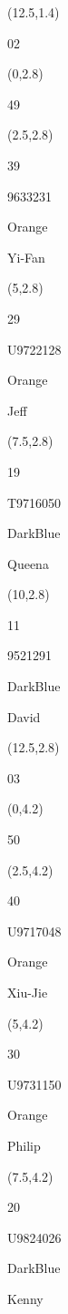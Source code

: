 \documentclass[a4paper]{article}
\newcommand{\myseat}[4]{%
\vspace{-0.1cm}
\parbox[t][2.2cm][t]{3.5cm}{
\small #1 %
\begin{description}
\vspace{-0.1cm}
\item [ID:] #2
\vspace{-0.1cm}
\item [Team:] #3 \normalsize
\vspace{-0.1cm}
\item \normalsize #4
\vspace{-0.1cm}
\end{description}
}
}
\begin{document}
\begin{CJK}{UTF8}{cyberbit}
\begin{textblock}{2.5}(12.5,1.4)
\textblockcolor{}
	\myseat{02}{}{}{}
\end{textblock}

\begin{textblock}{2.5}(0,2.8)
\textblockcolor{}
	\myseat{49}{}{}{}
\end{textblock}

\begin{textblock}{2.5}(2.5,2.8)
	\myseat{39}{9633231}{Orange}{Yi-Fan}
\end{textblock}

\begin{textblock}{2.5}(5,2.8)
	\myseat{29}{U9722128}{Orange}{Jeff}
\end{textblock}

\begin{textblock}{2.5}(7.5,2.8)
	\myseat{19}{T9716050}{DarkBlue}{Queena}
\end{textblock}

\begin{textblock}{2.5}(10,2.8)
	\myseat{11}{9521291}{DarkBlue}{David}
\end{textblock}

\begin{textblock}{2.5}(12.5,2.8)
\textblockcolor{}
	\myseat{03}{}{}{}
\end{textblock}

\begin{textblock}{2.5}(0,4.2)
\textblockcolor{}
	\myseat{50}{}{}{}
\end{textblock}

\begin{textblock}{2.5}(2.5,4.2)
	\myseat{40}{U9717048}{Orange}{Xiu-Jie}
\end{textblock}

\begin{textblock}{2.5}(5,4.2)
	\myseat{30}{U9731150}{Orange}{Philip}
\end{textblock}

\begin{textblock}{2.5}(7.5,4.2)
	\myseat{20}{U9824026}{DarkBlue}{Kenny}
\end{textblock}


\end{CJK}
\end{document}
